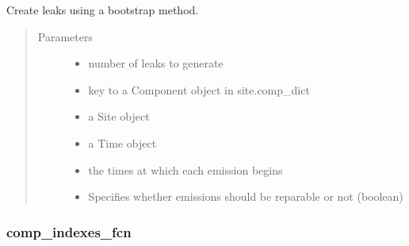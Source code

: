 \documentclass[letterpaper,10pt,english]{sphinxmanual}
\begin{document}
\begin{fulllineitems}
\label{\detokenize{index:feast.EmissionSimModules.emission_class_functions.bootstrap_emission_maker}}
Create leaks using a bootstrap method.
\begin{quote}\begin{description}
\item[{Parameters}] \leavevmode\begin{itemize}
\item {} 
 \textendash{} number of leaks to generate

\item {} 
 \textendash{} key to a Component object in site.comp\_dict

\item {} 
 \textendash{} a Site object

\item {} 
 \textendash{} a Time object

\item {} 
 \textendash{} the times at which each emission begins

\item {} 
 \textendash{} Specifies whether emissions should be reparable or not (boolean)

\end{itemize}

\end{description}\end{quote}

\end{fulllineitems}



\subsubsection{comp\_indexes\_fcn}
\label{\detokenize{index:comp-indexes-fcn}}
\end{document}
